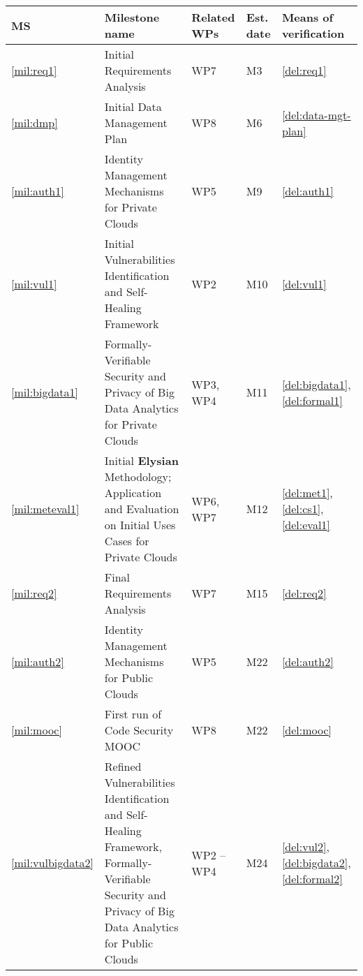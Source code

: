 \documentclass[a4paper,11pt]{article}
\newcommand{\project}[1]{\textbf{#1}\xspace}
\newcommand{\SECURITY}{\project{Elysian}}
\newcommand{\TheProject}{\SECURITY}
\begin{document}
\renewcommand{\thems}{MS\arabic{ms}}
\begin{minipage}{\textwidth}
\begin{center}
 \begin{tabular*}{\textwidth}{|p{1cm}|p{10.3cm}|p{1.2cm}|p{0.6cm}|p{2.7cm}|}  \hline
 \textbf{MS} & \textbf{Milestone name} & \textbf{Related WPs} & \textbf{Est. date} & \textbf{Means of
   verification} \\ %
\hline
\ref{mil:req1} & Initial Requirements Analysis & WP7 & M3 & \ref{del:req1} \\
   \hline
 \ref{mil:dmp} & Initial Data Management Plan & WP8 & M6 & \ref{del:data-mgt-plan} \\
   \hline
\ref{mil:auth1} & Identity Management Mechanisms for Private Clouds & WP5 & M9 & \ref{del:auth1} \\
   \hline
   \ref{mil:vul1} & Initial Vulnerabilities Identification and Self-Healing Framework & WP2 & M10 & \ref{del:vul1} \\
   \hline
   \ref{mil:bigdata1} & Formally-Verifiable Security and Privacy of Big Data Analytics for Private Clouds & WP3, WP4 & M11 & \ref{del:bigdata1}, \ref{del:formal1} \\
   \hline
   \ref{mil:meteval1} & Initial \TheProject{} Methodology; Application and Evaluation on Initial Uses Cases for Private Clouds & WP6, WP7 & M12 & \ref{del:met1}, \ref{del:cs1}, \ref{del:eval1} \\
   \hline
   \ref{mil:req2} & Final Requirements Analysis & WP7 & M15 & \ref{del:req2} \\
   \hline
   \ref{mil:auth2} & Identity Management Mechanisms for Public Clouds & WP5 & M22 & \ref{del:auth2} \\
   \hline
   \ref{mil:mooc} & First run of Code Security MOOC & WP8 & M22 & \ref{del:mooc} \\
   \hline
   \ref{mil:vulbigdata2} & Refined Vulnerabilities Identification and Self-Healing Framework, Formally-Verifiable Security and Privacy of Big Data Analytics for Public Clouds & WP2 -- WP4 & M24 & \ref{del:vul2}, \ref{del:bigdata2}, \ref{del:formal2} \\

\end{tabular*}
\end{center}
\end{minipage}
\end{document}
